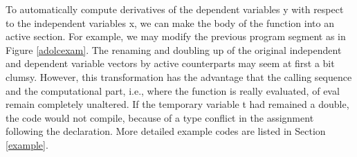 \documentclass[11pt,twoside]{article}
\begin{document}
To automatically compute derivatives of the dependent 
variables {\sf y} with respect to the independent variables {\sf x}, we
can make the body of the function into an active section. For
example, we may modify the previous program segment 
as in Figure \ref{adolcexam}.
The renaming and doubling up of the original independent and dependent
variable vectors by active counterparts may seem at first a bit clumsy.
However, this transformation has the advantage that the calling
sequence and the computational part, i.e., where the function is
really evaluated, of {\sf eval} remain completely
unaltered. If the temporary variable {\sf t} had remained a {\sf double},
the code would not compile, because of a type conflict in the assignment
following the declaration. More detailed example codes are listed in 
Section \ref{example}.
\end{document}
